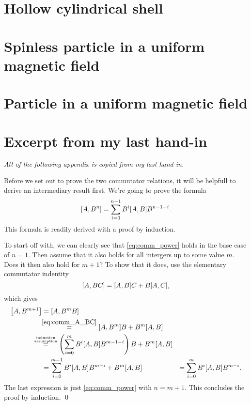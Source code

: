 \documentclass[11pt,letter, swedish, english
]{article}
\begin{document}
\section{Hollow cylindrical shell}





\section{Spinless particle in a uniform magnetic field}





\section{Particle in a uniform magnetic field}

\newpage
\appendix


\section{Excerpt from my last hand-in}\label{sec:comm}
\textit{All of the following appendix is copied from my last hand-in.}

Before we set out to prove the two commutator relations, it will be
helpfull to derive an intermediary result first. We're going to prove
the formula
\begin{equation} \label{eq:comm_power}
\comm{A}{B^n} = \sum_{i=0}^{n-1} B^{i}\comm{A}{B}B^{n-1-i}.
\end{equation}
This formula is readily derived with a proof by induction. 

To start off with, we can clearly see that \eqref{eq:comm_power} holds
in the base case of $n=1$. Then assume that it also holds for all
intergers up to some value $m$. Does it then also hold for $m+1$?
To show that it does, use the elementary commutator
indentity
\begin{equation} \label{eq:comm_A_BC}
\comm{A}{BC} = \comm{A}{B}C+B\comm{A}{C},
\end{equation}
which gives
\begin{equation}
\begin{aligned}
\comm{A}{B^{m+1}} &= \comm{A}{B^{m}B} \\
&\hspace{-3pt}\stackrel{\eqref{eq:comm_A_BC}}{=} \comm{A}{B^{m}}B + B^m\comm{A}{B}\\
&\hspace{-14pt}\stackrel{\stackrel{\text{\tiny induction}}{\text{\tiny assumption}}}{=}
\left(\sum_{i=0}^{m} B^{i}\comm{A}{B}B^{m-1-i}\right) B + B^m\comm{A}{B}\\
&=\sum_{i=0}^{m-1} B^{i}\comm{A}{B}B^{m-i} + B^m\comm{A}{B}&=\sum_{i=0}^{m} B^{i}\comm{A}{B}B^{m-i}.
\end{aligned}
\end{equation}
The last expression is just \eqref{eq:comm_power} with $n=m+1$. This
concludes the proof by induction. \qed
\end{document}
